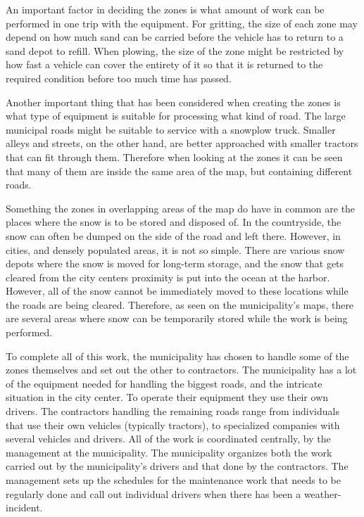 An important factor in deciding the zones is what amount of work can be performed in one trip with the equipment. For gritting, the size of each zone may depend on how much sand can be carried before the vehicle has to return to a sand depot to refill. When plowing, the size of the zone might be restricted by how fast a vehicle can cover the entirety of it so that it is returned to the required condition before too much time has passed.

Another important thing that has been considered when creating the zones is what type of equipment is suitable for processing what kind of road. The large municipal roads might be suitable to service with a snowplow truck. Smaller alleys and streets, on the other hand, are better approached with smaller tractors that can fit through them. Therefore when looking at the zones it can be seen that many of them are inside the same area of the map, but containing different roads.

Something the zones in overlapping areas of the map do have in common are the places where the snow is to be stored and disposed of. In the countryside, the snow can often be dumped on the side of the road and left there. However, in cities, and densely populated areas, it is not so simple. There are various snow depots where the snow is moved for long-term storage, and the snow that gets cleared from the city centers proximity is put into the ocean at the harbor. However, all of the snow cannot be immediately moved to these locations while the roads are being cleared. Therefore, as seen on the municipality's maps, there are several areas where snow can be temporarily stored while the work is being performed.

To complete all of this work, the municipality has chosen to handle some of the zones themselves and set out the other to contractors. The municipality has a lot of the equipment needed for handling the biggest roads, and the intricate situation in the city center. To operate their equipment they use their own drivers. The contractors handling the remaining roads range from individuals that use their own vehicles (typically tractors), to specialized companies with several vehicles and drivers. All of the work is coordinated centrally, by the management at the municipality. The municipality organizes both the work carried out by the municipality's drivers and that done by the contractors. The management sets up the schedules for the maintenance work that needs to be regularly done and call out individual drivers when there has been a weather-incident.

